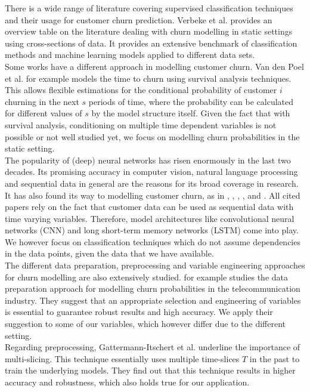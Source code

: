 \documentclass[12pt,titlepage]{article}
\begin{document}
There is a wide range of literature covering supervised classification techniques and their usage for customer churn prediction. Verbeke et al. \cite{verbekechurn} provides an overview table on the literature dealing with churn modelling in static settings using cross-sections of data. It provides an extensive benchmark of classification methods and machine learning models applied to different data sets. \\
Some works have a different approach in modelling customer churn. Van den Poel et al. \cite{vandenpoel} for example models the time to churn using survival analysis techniques. This allows flexible estimations for the conditional probability of customer $i$ churning in the next $s$ periods of time, where the probability can be calculated for different values of $s$ by the model structure itself. Given the fact that with survival analysis, conditioning on multiple time dependent variables is not possible or not well studied yet, we focus on modelling churn probabilities in the static setting. \\
The popularity of (deep) neural networks has risen enormously in the last two decades. Its promising accuracy in computer vision, natural language processing and sequential data in general are the reasons for its broad coverage in research. It has also found its way to modelling customer churn, as in \cite{martins}, \cite{tan2018}, \cite{wangperawong}, \cite{zaratiegui}, \cite{zhou} and \cite{mena}. All cited papers rely on the fact that customer data can be used as sequential data with time varying variables. Therefore, model architectures like convolutional neural networks (CNN) and long short-term memory networks (LSTM) come into play. We however focus on classification techniques which do not assume dependencies in the data points, given the data that we have available. \\
The different data preparation, preprocessing and variable engineering approaches for churn modelling are also extensively studied. \cite{coussement} for example studies the data preparation approach for modelling churn probabilities in the telecommunication industry. They suggest that an appropriate selection and engineering of variables is essential to guarantee robust results and high accuracy. We apply their suggestion to some of our variables, which however differ due to the different setting. \\
Regarding preprocessing, Gattermann-Itschert et al. \cite{multiplets} underline the importance of multi-slicing. This technique essentially uses multiple time-slices $T$ in the past to train the underlying models. They find out that this technique results in higher accuracy and robustness, which also holds true for our application. \\
\end{document}
